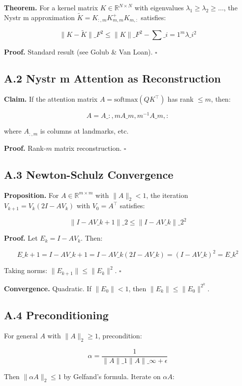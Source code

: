 \textbf{Theorem.} For a kernel matrix $K \in \mathbb{R}^{N \times N}$ with 
eigenvalues $\lambda_1 \geq \lambda_2 \geq \dots$, the Nystr m 
approximation $\tilde{K} = K_{:, m} K_{m, m}^+ K_{m, :}$ satisfies:

\[
\|K - \tilde{K}\|\_F^2 \leq \|K\|\_F^2 - \sum\_{i=1}^{m} \lambda\_i^2
\tag{A.1}
\]

\textbf{Proof.} Standard result (see Golub \& Van Loan). $\square$

\subsection{A.2 Nystr m Attention as Reconstruction}

\textbf{Claim.} If the attention matrix $A = \text{softmax}(Q K^\top)$ has rank $\leq m$, 
then:

\[
A = A\_{:, m} A\_{m, m}^{-1} A\_{m, :}
\tag{A.2}
\]

where $A_{:, m}$ is columns at landmarks, etc.

\textbf{Proof.} Rank-$m$ matrix reconstruction. $\square$

\subsection{A.3 Newton-Schulz Convergence}

\textbf{Proposition.} For $A \in \mathbb{R}^{m \times m}$ with $\|A\|_2 < 1$, 
the iteration $V_{k+1} = V_k (2I - A V_k)$ with $V_0 = A^\top$ satisfies:

\[
\|I - A V\_{k+1}\|\_2 \leq \|I - A V\_k\|\_2^2
\tag{A.3}
\]

\textbf{Proof.} Let $E_k = I - A V_k$. Then:

\[
E\_{k+1} = I - A V\_{k+1} = I - A V\_k (2I - A V\_k) = (I - A V\_k)^2 = E\_k^2
\tag{A.4}
\]

Taking norms: $\|E_{k+1}\| \leq \|E_k\|^2$. $\square$

\textbf{Convergence.} Quadratic. If $\|E_0\| < 1$, then $\|E_k\| \leq \|E_0\|^{2^k}$.

\subsection{A.4 Preconditioning}

For general $A$ with $\|A\|_2 \geq 1$, precondition:

\[
\alpha = \frac{1}{\|A\|\_1 \|A\|\_\infty + \epsilon}
\tag{A.5}
\]

Then $\|\alpha A\|_2 \leq 1$ by Gelfand's formula. Iterate on $\alpha A$:


